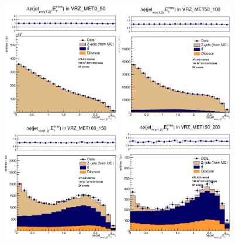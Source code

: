 \begin{figure}[htbp]
\centering
\includegraphics[width=0.45\textwidth]{Images/SUSY/reweight_Ptll_all_SF_minDPhi2JetsMet_VRZ_MET0_50.eps}
\includegraphics[width=0.45\textwidth]{Images/SUSY/reweight_Ptll_all_SF_minDPhi2JetsMet_VRZ_MET50_100.eps}
\includegraphics[width=0.45\textwidth]{Images/SUSY/reweight_Ptll_all_SF_minDPhi2JetsMet_VRZ_MET100_150.eps}
\includegraphics[width=0.45\textwidth]{Images/SUSY/reweight_Ptll_all_SF_minDPhi2JetsMet_VRZ_MET150_200.eps}

\end{figure}
